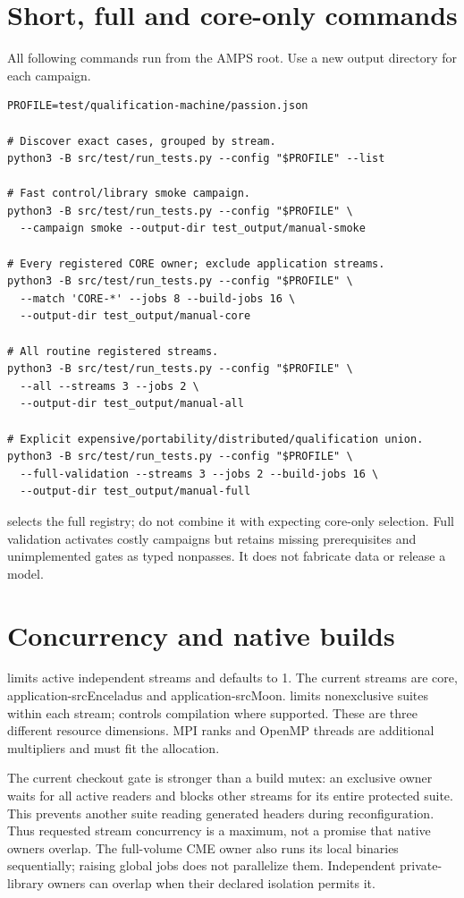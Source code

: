 \section{Short, full and core-only commands}
All following commands run from the AMPS root. Use a new output directory
for each campaign.
\begin{lstlisting}
PROFILE=test/qualification-machine/passion.json

# Discover exact cases, grouped by stream.
python3 -B src/test/run_tests.py --config "$PROFILE" --list

# Fast control/library smoke campaign.
python3 -B src/test/run_tests.py --config "$PROFILE" \
  --campaign smoke --output-dir test_output/manual-smoke

# Every registered CORE owner; exclude application streams.
python3 -B src/test/run_tests.py --config "$PROFILE" \
  --match 'CORE-*' --jobs 8 --build-jobs 16 \
  --output-dir test_output/manual-core

# All routine registered streams.
python3 -B src/test/run_tests.py --config "$PROFILE" \
  --all --streams 3 --jobs 2 \
  --output-dir test_output/manual-all

# Explicit expensive/portability/distributed/qualification union.
python3 -B src/test/run_tests.py --config "$PROFILE" \
  --full-validation --streams 3 --jobs 2 --build-jobs 16 \
  --output-dir test_output/manual-full
\end{lstlisting}
\code{--all} selects the full registry; do not combine it with
 expecting core-only selection. Full validation
activates costly campaigns but retains missing prerequisites and unimplemented
gates as typed nonpasses. It does not fabricate data or release a model.

\section{Concurrency and native builds}
 limits active independent streams and defaults to 1.
The current streams are core, application-srcEnceladus and application-srcMoon.
\code{--jobs N} limits nonexclusive suites within each stream;
\code{--build-jobs N} controls compilation where supported.
These are three different resource dimensions. MPI ranks and OpenMP threads
are additional multipliers and must fit the allocation.

The current checkout gate is stronger than a build mutex: an exclusive owner
waits for all active readers and blocks other streams for its entire protected
suite. This prevents another suite reading generated headers during
reconfiguration. Thus requested stream concurrency is a maximum, not a
promise that native owners overlap. The full-volume CME owner also runs its
local binaries sequentially; raising global jobs does not parallelize them.
Independent private-library owners can overlap when their declared isolation
permits it.

